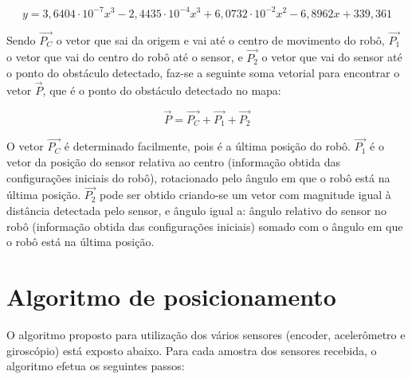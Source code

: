 \begin{equation}
  y = 3,6404 \cdot 10^{-7} x^3 - 2,4435 \cdot 10^{-4} x^3 + 6,0732 \cdot 10^{-2} x^2 - 6,8962 x + 339,361
  \label{eq:IR_dist}
\end{equation}


Sendo $\overrightarrow{P_C}$ o vetor que sai da origem e vai até o centro de movimento do robô, $\overrightarrow{P_1}$ o vetor que vai do centro do robô até o sensor, e $\overrightarrow{P_2}$ o vetor que vai do sensor até o ponto do obstáculo detectado, faz-se a seguinte soma vetorial para encontrar o vetor $\overrightarrow{P}$, que é o ponto do obstáculo detectado no mapa:

\begin{equation}
  \overrightarrow{P} = \overrightarrow{P_C} + \overrightarrow{P_1} + \overrightarrow{P_2}
  \label{eq:IR_vector}
\end{equation}


O vetor $\overrightarrow{P_C}$ é determinado facilmente, pois é a última posição do robô. $\overrightarrow{P_1}$ é o vetor da posição do sensor relativa ao centro (informação obtida das configurações iniciais do robô), rotacionado pelo ângulo em que o robô está na última posição. $\overrightarrow{P_2}$ pode ser obtido criando-se um vetor com magnitude igual à distância detectada pelo sensor, e ângulo igual a: ângulo relativo do sensor no robô (informação obtida das configurações iniciais) somado com o ângulo em que o robô está na última posição.

\section{Algoritmo de posicionamento}

O algoritmo proposto para utilização dos vários sensores (encoder, acelerômetro e giroscópio) está exposto abaixo. Para cada amostra dos sensores recebida, o algoritmo efetua os seguintes passos:

